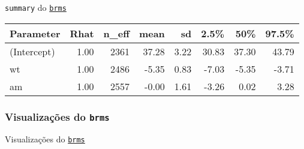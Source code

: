 \begin{frame}{\texttt{summary} do \href{https://paul-buerkner.github.io/brms/}{\texttt{brms}}}
	\begin{table}[ht]
		\centering
		\begin{tabular}{lrrrrrrr}
			\toprule
			Parameter   & Rhat & n\_eff & mean  & sd   & 2.5\% & 50\%  & 97.5\% \\
			\midrule
			(Intercept) & 1.00 & 2361   & 37.28 & 3.22 & 30.83 & 37.30 & 43.79  \\
			wt          & 1.00 & 2486   & -5.35 & 0.83 & -7.03 & -5.35 & -3.71  \\
			am          & 1.00 & 2557   & -0.00 & 1.61 & -3.26 & 0.02  & 3.28   \\
			\bottomrule
		\end{tabular}
	\end{table}
\end{frame}
\subsubsection{Visualizações do \texttt{brms}}
\begin{frame}{Visualizações do \href{https://paul-buerkner.github.io/brms/}{\texttt{brms}}}
	\begin{columns}
		\begin{column}{0.5\textwidth}
			\centering
			\begin{figure}
				\resizebox{0.9\linewidth}{!}{}
			\end{figure}
		\end{column}
		\begin{column}{0.5\textwidth}
			\centering
			\begin{figure}
				\resizebox{0.9\linewidth}{!}{}
			\end{figure}
		\end{column}
	\end{columns}
\end{frame}

